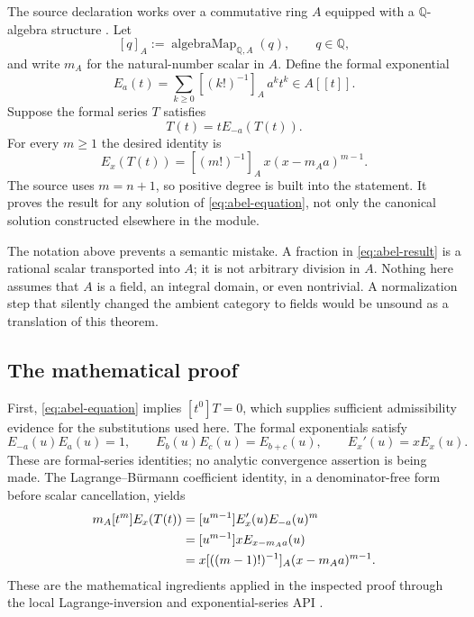 \documentclass[11pt,letterpaper]{article}
\newcommand{\code}[1]{\texttt{\detokenize{#1}}}
\newcommand{\Q}{\mathbb Q}
\theoremstyle{remark}
\begin{document}
The source declaration \code{Fabius.coeff_exp_subst_of_abel_eq} works over a commutative ring $A$ equipped with a $\Q$-algebra structure \cite{proveit-abel}. Let
\[
 [q]_A:=\operatorname{algebraMap}_{\Q,A}(q),\qquad q\in\Q,
\]
and write $m_A$ for the natural-number scalar in $A$. Define the formal exponential
\[
 E_a(t)=\sum_{k\geq0}[(k!)^{-1}]_A\,a^k t^k\in A[[t]].
\]
Suppose the formal series $T$ satisfies
\begin{equation}
 T(t)=t E_{-a}(T(t)).\label{eq:abel-equation}
\end{equation}
For every $m\geq1$ the desired identity is
\begin{equation}
 [t^m]E_x(T(t))=[(m!)^{-1}]_A\,x(x-m_Aa)^{m-1}.
 \label{eq:abel-result}
\end{equation}
The source uses $m=n+1$, so positive degree is built into the statement. It proves the result for any solution of \eqref{eq:abel-equation}, not only the canonical solution constructed elsewhere in the module.

The notation above prevents a semantic mistake. A fraction in \eqref{eq:abel-result} is a rational scalar transported into $A$; it is not arbitrary division in $A$. Nothing here assumes that $A$ is a field, an integral domain, or even nontrivial. A normalization step that silently changed the ambient category to fields would be unsound as a translation of this theorem.

\subsection{The mathematical proof}

First, \eqref{eq:abel-equation} implies $[t^0]T=0$, which supplies sufficient admissibility evidence for the substitutions used here. The formal exponentials satisfy
\[
 E_{-a}(u)E_a(u)=1,
 \qquad E_b(u)E_c(u)=E_{b+c}(u),
 \qquad E_x'(u)=xE_x(u).
\]
These are formal-series identities; no analytic convergence assertion is being made. The Lagrange--B\"urmann coefficient identity, in a denominator-free form before scalar cancellation, yields
\begin{align}
 m_A[t^m]E_x(T(t))
  &=[u^{m-1}]E_x'(u)E_{-a}(u)^m\notag\\
  &=[u^{m-1}]xE_{x-m_Aa}(u)\notag\\
  &=x[((m-1)!)^{-1}]_A(x-m_Aa)^{m-1}.
 \label{eq:abel-calculation}
\end{align}
These are the mathematical ingredients applied in the inspected proof through the local Lagrange-inversion and exponential-series API \cite{proveit-abel}.
\end{document}
